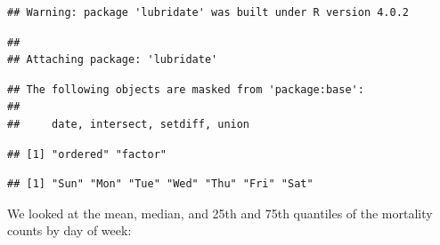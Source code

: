 \documentclass[
]{book}
\newenvironment{Shaded}{\begin{snugshade}}{\end{snugshade}}
\newcommand{\DataTypeTok}[1]{\textcolor[rgb]{0.13,0.29,0.53}{#1}}
\newcommand{\FloatTok}[1]{\textcolor[rgb]{0.00,0.00,0.81}{#1}}
\newcommand{\KeywordTok}[1]{\textcolor[rgb]{0.13,0.29,0.53}{\textbf{#1}}}
\newcommand{\NormalTok}[1]{#1}
\newcommand{\OperatorTok}[1]{\textcolor[rgb]{0.81,0.36,0.00}{\textbf{#1}}}
\newcommand{\OtherTok}[1]{\textcolor[rgb]{0.56,0.35,0.01}{#1}}
\newcommand{\StringTok}[1]{\textcolor[rgb]{0.31,0.60,0.02}{#1}}
\begin{document}
\begin{verbatim}
## Warning: package 'lubridate' was built under R version 4.0.2
\end{verbatim}

\begin{verbatim}
## 
## Attaching package: 'lubridate'
\end{verbatim}

\begin{verbatim}
## The following objects are masked from 'package:base':
## 
##     date, intersect, setdiff, union
\end{verbatim}

\begin{Shaded}
\end{Shaded}

\begin{verbatim}
## [1] "ordered" "factor"
\end{verbatim}

\begin{Shaded}
\end{Shaded}

\begin{verbatim}
## [1] "Sun" "Mon" "Tue" "Wed" "Thu" "Fri" "Sat"
\end{verbatim}

We looked at the mean, median, and 25th and 75th quantiles of the mortality
counts by day of week:

\begin{Shaded}
\end{Shaded}
\end{document}
